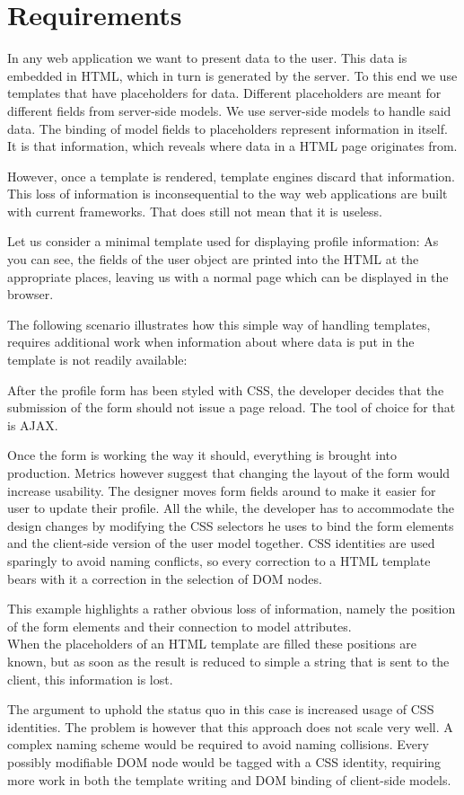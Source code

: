 \chapter{Requirements}
\label{chap:requirements}
In any web application we want to present data to the user.
This data is embedded in HTML, which in turn is generated by the server.
To this end we use templates that have placeholders for data.
Different placeholders are meant for different fields from server-side models.
We use server-side models to handle said data.
The binding of model fields to placeholders represent information in
itself. It is that information, which reveals where data in a HTML page
originates from.

However, once a template is rendered, template engines discard that information.
This loss of information is inconsequential to the way web applications are
built with current frameworks. That does still not mean that it is useless.

Let us consider a minimal template used for displaying profile information:
\todo{\dots}
As you can see, the fields of the user object are printed into the HTML
at the appropriate places, leaving us with a normal page which can be
displayed in the browser.

The following scenario illustrates how this simple way of handling templates,
requires additional work when information about where data is put in the
template is not readily available:

\begin{shaded}
After the profile form has been styled with CSS, the developer decides that
the submission of the form should not issue a page reload. The tool of choice
for that is AJAX.

Once the form is working the way it should, everything is brought into
production. Metrics however suggest that changing the layout of the form would
increase usability.
The designer moves form fields around to make it easier for user to update
their profile.
All the while, the developer has to accommodate the design changes by modifying
the CSS selectors he uses to bind the form elements and the client-side version
of the user model together.
CSS identities are used sparingly to avoid naming conflicts, so every correction
to a HTML template bears with it a correction in the selection of DOM nodes.
\end{shaded}
This example highlights a rather obvious loss of information, namely
the position of the form elements and their connection to model attributes.\\
When the placeholders of an HTML template are filled these positions are known,
but as soon as the result is reduced to simple a string that is sent
to the client, this information is lost.

The argument to uphold the status quo in this case is increased usage of
CSS identities. The problem is however that this approach does not scale very well.
A complex naming scheme would be required to avoid naming collisions.
Every possibly modifiable DOM node would be tagged with a CSS identity,
requiring more work in both the template writing and DOM binding of
client-side models.
